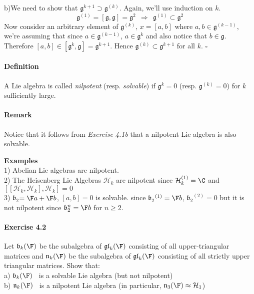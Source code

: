 \documentclass[11pt]{article}
\newcommand{\gl}{\ensuremath{\mathfrak{gl}}}
\newcommand{\g}{\ensuremath{\mathfrak{g}}}
\newcommand{\He}{\ensuremath{\mathcal{H}}}
\newcommand{\be}{\ensuremath{\mathfrak{b}_2}}
\newcommand{\bk}{\ensuremath{\mathfrak{b}}}
\newcommand{\nk}{\ensuremath{\mathfrak{n}}}
\begin{document}
b)We need to show that $\g^{k+1} \supset \g^{(k)}$. Again, we'll use
induction on $k$.
\begin{equation}
\g^{(1)} = [\g,\g] = \g^2 ~~ \Rightarrow ~~ \g^{(1)} \subset \g^2
\end{equation}
Now consider an arbitrary element of $\g^(k)$, $x = [a,b]$ where $a,b
\in \g^{(k-1)}$, we're assuming that since $a \in \g^{(k-1)}$, $a \in
\g^k$ and also notice that $b \in \g$. Therefore $[a,b] \in [\g^k, \g]
= \g^{k+1}$. Hence $\g^{(k)} \subset \g^{k+1}$ for all $k$. $\square$

\paragraph{Definition}
A Lie algebra is called {\it nilpotent} (resp. {\it solvable}) if $\g^k = 0$ 
(resp. $\g^{(k)} = 0$) for $k$ sufficiently large.

\paragraph{Remark}
Notice that it follows from {\it Exercise 4.1b} that a nilpotent Lie algebra is also
solvable.

{\bf Examples} \\
1) Abelian Lie algebras are nilpotent. \\
2) The Heisenberg Lie Algebras $\He_k$ are nilpotent since 
$\He_k^{(1)} = \C$ and $[[\He_k,\He_k],\He_k]=0$ \\
3) \be $= \F a +\F b$, $[a,b]=0$ is solvable.
since \be $^{(1)} = \F b$, $\be^{(2)}=0$ but it is not
nilpotent since $\be^n = \F b$ for $n \geq 2$.


\paragraph{Exercise 4.2} Let $\bk_k(\F)$ be the subalgebra of $\gl_k(\F)$ consisting
of all upper-triangular matrices and $\nk_k(\F)$ be the subalgebra of $\gl_k(\F)$ consisting
of all strictly upper triangular matrices. Show that: \\
a) $\bk_k(\F)$~ is a solvable Lie algebra (but not nilpotent) \\
b) $\nk_k(\F)$~ is a nilpotent Lie algebra (in particular, $\nk_3(\F) \approx \He_1$)
\end{document}
